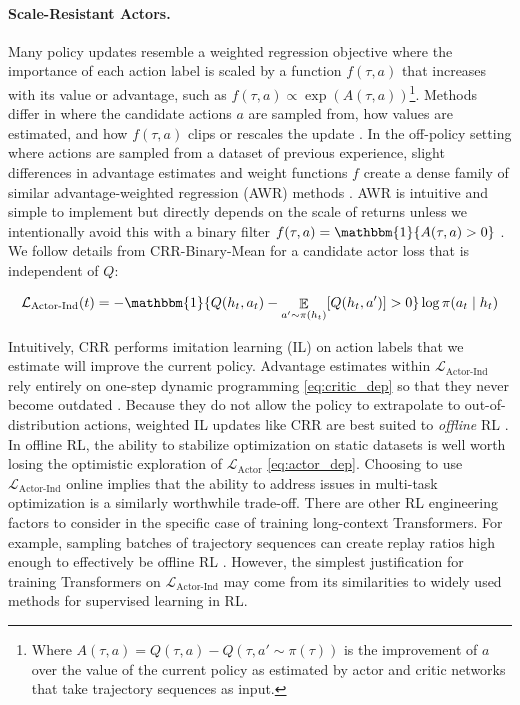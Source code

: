 \paragraph{Scale-Resistant Actors.} Many policy updates resemble a weighted regression objective where the importance of each action label is scaled by a function $f(\tau, a)$ that increases with its value or advantage, such as $f(\tau, a) \propto \exp(A(\tau, a))$\footnote{Where $A(\tau, a) = Q(\tau, a) - Q(\tau, a' \sim \pi(\tau))$ is the improvement of $a$ over the value of the current policy as estimated by actor and critic networks that take trajectory sequences as input.}. Methods differ in where the candidate actions $a$ are sampled from, how values are estimated, and how $f(\tau, a)$ clips or rescales the update \cite{hessel2021muesli, schulman2017proximal, abdolmaleki2018maximum, peng2019advantage, wang2018exponentially}. In the off-policy setting where actions are sampled from a dataset of previous experience, slight differences in advantage estimates and weight functions $f$ create a dense family of similar advantage-weighted regression (AWR) methods \cite{peng2019advantage, wang2018exponentially, chen2020bail, siegel2020keep, grigsby2021closer}. AWR is intuitive and simple to implement but directly depends on the scale of returns unless we intentionally avoid this with a binary filter $f(\tau, a) = \mathbbm{1}\{A(\tau, a) > 0\}$ \cite{wang2020critic, nair2018overcoming}. We follow details from CRR-Binary-Mean \cite{wang2020critic} for a candidate actor loss that is independent of $Q$:

\vspace{-4mm}
\begin{align}
    \label{eq:actor_ind}
    \mathcal{L}_{\text{Actor-Ind}}(t) = -\mathbbm{1}\{Q(h_t, a_t) - \mathop{\mathbb{E}}_{a' \sim \pi(h_t)}[Q(h_t, a')] > 0\}\log\pi(a_t \mid h_t)
\end{align}
\vspace{-4mm}

Intuitively, CRR performs imitation learning (IL) on action labels that we estimate will improve the current policy. Advantage estimates within $\mathcal{L}_{\text{Actor-Ind}}$ rely entirely on one-step dynamic programming \eqref{eq:critic_dep} so that they never become outdated \cite{wang2020critic, nair2020awac}. Because they do not allow the policy to extrapolate to out-of-distribution actions, weighted IL updates like CRR are best suited to \textit{offline} RL \cite{levine2020offline}. In offline RL, the ability to stabilize optimization on static datasets is well worth losing the optimistic exploration of $\mathcal{L}_{\text{Actor}}$ \eqref{eq:actor_dep}. Choosing to use $\mathcal{L}_{\text{Actor-Ind}}$ online implies that the ability to address issues in multi-task optimization is a similarly worthwhile trade-off. There are other RL engineering factors to consider in the specific case of training long-context Transformers. For example, sampling batches of trajectory sequences can create replay ratios high enough to effectively be offline RL \cite{fedus2020revisiting}. However, the simplest justification for training Transformers on $\mathcal{L}_{\text{Actor-Ind}}$ may come from its similarities to widely used methods for supervised learning in RL.

